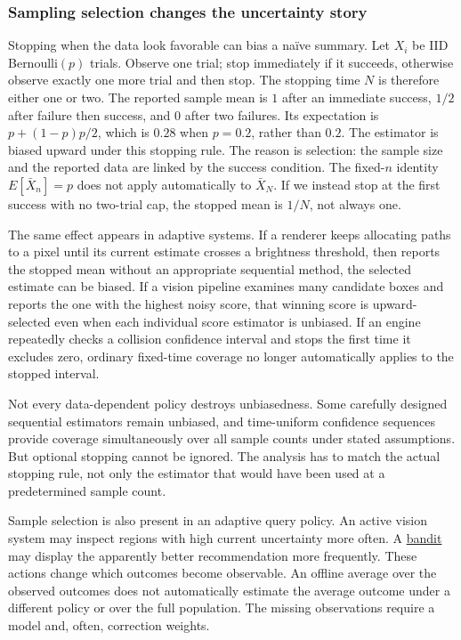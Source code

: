\subsubsection{Sampling selection changes the uncertainty story}\label{02-foundations-ii-ch029-sampling-selection-changes-the-uncertainty-story}

\hypertarget{02-foundations-ii-ch029-sampling-selection-changes-the-uncertainty-story}{}

Stopping when the data look favorable can bias a naïve summary. Let \(X_i\) be IID Bernoulli\((p)\) trials. Observe one trial; stop immediately if it succeeds, otherwise observe exactly one more trial and then stop. The stopping time \(N\) is therefore either one or two. The reported sample mean is \(1\) after an immediate success, \(1/2\) after failure then success, and \(0\) after two failures. Its expectation is \(p+(1-p)p/2\), which is \(0.28\) when \(p=0.2\), rather than \(0.2\). The estimator is biased upward under this stopping rule. The reason is selection: the sample size and the reported data are linked by the success condition. The fixed-\(n\) identity \(E[\bar X_n]=p\) does not apply automatically to \(\bar X_N\). If we instead stop at the first success with no two-trial cap, the stopped mean is \(1/N\), not always one.

The same effect appears in adaptive systems. If a renderer keeps allocating paths to a pixel until its current estimate crosses a brightness threshold, then reports the stopped mean without an appropriate sequential method, the selected estimate can be biased. If a vision pipeline examines many candidate boxes and reports the one with the highest noisy score, that winning score is upward-selected even when each individual score estimator is unbiased. If an engine repeatedly checks a collision confidence interval and stops the first time it excludes zero, ordinary fixed-time coverage no longer automatically applies to the stopped interval.

Not every data-dependent policy destroys unbiasedness. Some carefully designed sequential estimators remain unbiased, and time-uniform confidence sequences provide coverage simultaneously over all sample counts under stated assumptions. But optional stopping cannot be ignored. The analysis has to match the actual stopping rule, not only the estimator that would have been used at a predetermined sample count.

Sample selection is also present in an adaptive query policy. An active vision system may inspect regions with high current uncertainty more often. A \hyperref[appendix-3dc863dbddf3]{bandit} may display the apparently better recommendation more frequently. These actions change which outcomes become observable. An offline average over the observed outcomes does not automatically estimate the average outcome under a different policy or over the full population. The missing observations require a model and, often, correction weights.

